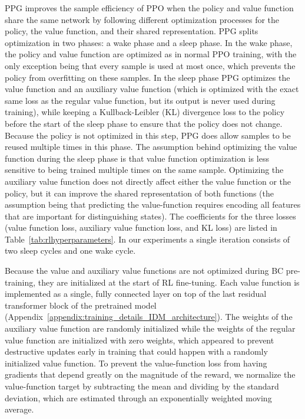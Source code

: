 PPG improves the sample efficiency of PPO when the policy and value function share the same network by following different optimization processes for the policy, the value function, and their shared representation.
PPG splits optimization in two phases: a wake phase and a sleep phase.
In the wake phase, the policy and value function are optimized as in normal PPO training, with the only exception being that every sample is used at most once, which prevents the policy from overfitting on these samples.
In the sleep phase PPG optimizes the value function and an auxiliary value function (which is optimized with the exact same loss as the regular value function, but its output is never used during training), while keeping a Kullback-Leibler (KL) divergence loss to the policy before the start of the sleep phase to ensure that the policy does not change. Because the policy is not optimized in this step, PPG does allow samples to be reused multiple times in this phase.
The assumption behind optimizing the value function during the sleep phase is that value function optimization is less sensitive to being trained multiple times on the same sample.
Optimizing the auxiliary value function does not directly affect either the value function or the policy, but it can improve the shared representation of both functions (the assumption being that predicting the value-function requires encoding all features that are important for distinguishing states).
The coefficients for the three losses (value function loss, auxiliary value function loss, and KL loss) are listed in Table~\ref{tab:rlhyperparameters}.
In our experiments a single iteration consists of two sleep cycles and one wake cycle.

Because the value and auxiliary value functions are not optimized during BC pre-training, they are initialized at the start of RL fine-tuning. 
Each value function is implemented as a single, fully connected layer on top of the last residual transformer block of the pretrained model (Appendix~\ref{appendix:training_details_IDM_architecture}).
The weights of the auxiliary value function are randomly initialized while the weights of the regular value function are initialized with zero weights, which appeared to prevent destructive updates early in training that could happen with a randomly initialized value function.
To prevent the value-function loss from having gradients that depend greatly on the magnitude of the reward, we normalize the value-function target by subtracting the mean and dividing by the standard deviation, which are estimated through an exponentially weighted moving average.


